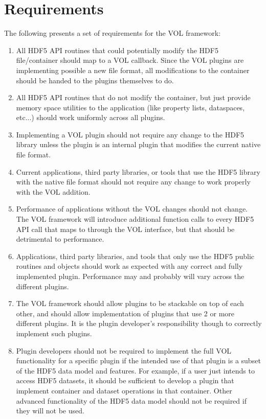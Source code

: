 \documentclass[letterpaper,hyper]{THG_RFC}
\begin{document}
\section{Requirements}
The following presents a set of requirements for the VOL framework:
\begin{enumerate}
\item All HDF5 API routines that could potentially modify the HDF5 file/container should map to a VOL callback. Since the VOL plugins are implementing possible a new file format, all modifications to the container should be handed to the plugins themselves to do.
\item All HDF5 API routines that do not modify the container, but just provide memory space utilities to the application (like property lists, dataspaces, etc...) should work uniformly across all plugins. 
\item Implementing a VOL plugin should not require any change to the HDF5 library unless the plugin is an internal plugin that modifies the current native file format. 
\item Current applications, third party libraries, or tools that use the HDF5 library with the native file format should not require any change to work properly with the VOL addition.
\item Performance of applications without the VOL changes should not change. The VOL framework will introduce additional function calls to every HDF5 API call that maps to through the VOL interface, but that should be detrimental to performance.
\item Applications, third party libraries, and tools that only use the HDF5 public routines and objects should work as expected with any correct and fully implemented plugin. Performance may and probably will vary across the different plugins.
\item The VOL framework should allow plugins to be stackable on top of each other, and should allow implementation of plugins that use 2 or more different plugins. It is the plugin developer's  responsibility though to correctly implement such plugins.
\item Plugin developers should not be required to implement the full VOL functionality for a specific plugin if the intended use of that plugin is a subset of the HDF5 data model and features. For example, if a user just intends to access HDF5 datasets, it should be sufficient to develop a plugin that implement container and dataset operations in that container. Other advanced functionality of the HDF5 data model should not be required if they will not be used.

\end{enumerate}
\end{document}
